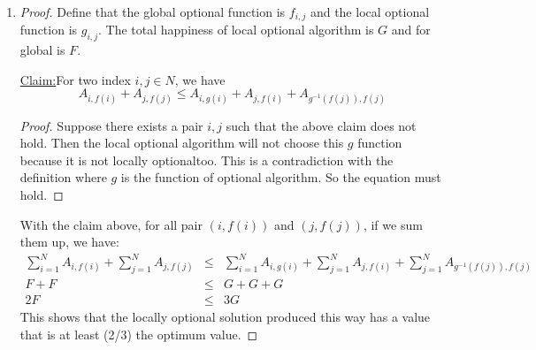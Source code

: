 \documentclass{article}
\newenvironment{claim}[1]{\par\noindent\underline{Claim:}\space#1}{}
\begin{document}
\begin{enumerate}
			\item \begin{proof}Define that the global optional function is $f_{i, j}$ and the local optional function is $g_{i, j}$. The total happiness of local optional algorithm is $G$ and for global is $F$.
			\begin{claim}
				For two index $i, j \in N$, we have
					\begin{equation}
						A_{i, f(i)} + A_{j, f(j)} \leq A_{i, g(i)} + A_{j, f(i)} + A_{g^{-1}(f(j)), f(j)}
					\end{equation}
			\end{claim}
			\begin{proof}
				Suppose there exists a pair $i, j$ such that the above claim does not hold. Then the local optional algorithm will not choose this $g$ function because it is not locally optionaltoo. This is a contradiction with the definition where $g$ is the function of optional algorithm. So the equation must hold.
			\end{proof}
			With the claim above, for all pair $(i, f(i))$ and $(j, f(j))$, if we sum them up, we have:
				\begin{eqnarray}
					\sum_{i = 1}^N A_{i, f(i)} + \sum_{j = 1}^N A_{j, f(j)} & \leq & \sum_{i = 1}^N{A_{i, g(i)}} + \sum_{j = 1}^N{A_{j, f(i)}} + \sum_{j = 1}^N{A_{g^{-1}(f(j)), f(j)}} \nonumber \\
						F + F & \leq & G + G + G \nonumber \\
							2F & \leq & 3G
				\end{eqnarray}
			This shows that the locally optional solution produced this way has a value that is at least (2/3) the optimum value.
			\end{proof}
		\end{enumerate}
\end{document}
